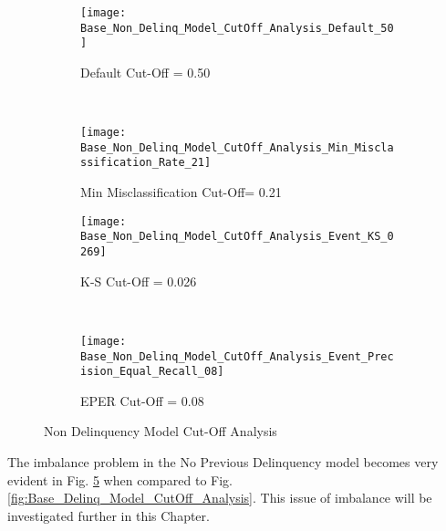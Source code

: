 \begin{figure}[H]
	\centering
	\begin{subfigure}[b]{ 0.45\textwidth}
		\captionsetup{font=scriptsize}
		\texttt{[image: Base\_Non\_Delinq\_Model\_CutOff\_Analysis\_Default\_50]}\caption{Default Cut-Off = 0.50}\label{fig:Base_Non_Delinq_Model_CutOff_Analysis_Default_50}
	\end{subfigure}  ~\quad
	\begin{subfigure}[b]{0.45\textwidth}
		\captionsetup{font=scriptsize}
		\texttt{[image: Base\_Non\_Delinq\_Model\_CutOff\_Analysis\_Min\_Misclassification\_Rate\_21]}
		\caption{Min Misclassification Cut-Off= 0.21}\label{fig:Base_Non_Delinq_Model_CutOff_Analysis_Min_Misclassification_Rate_17}
	\end{subfigure} 
	\medskip \newline
	\begin{subfigure}[b]{0.45\textwidth}
		\captionsetup{font=scriptsize}
		\texttt{[image: Base\_Non\_Delinq\_Model\_CutOff\_Analysis\_Event\_KS\_0269]}
		\caption{K-S Cut-Off = 0.026}\label{fig:Base_Non_Delinq_Model_CutOff_Analysis_Event_KS_026}
	\end{subfigure} ~\quad
	\begin{subfigure}[b]{0.45\textwidth}
		\captionsetup{font=scriptsize}
		\texttt{[image: Base\_Non\_Delinq\_Model\_CutOff\_Analysis\_Event\_Precision\_Equal\_Recall\_08]}
		\caption{EPER Cut-Off = 0.08}\label{fig:Base_Non_Delinq_Model_CutOff_Analysis_Event_Precision_Equal_Recall_09}
	\end{subfigure}
	\caption{Non Delinquency Model Cut-Off Analysis}
	\label{fig:NonDelinquencyModelCutOffAnalysis}
\end{figure}

The imbalance problem in the No Previous Delinquency model becomes very evident in Fig.  \ref{fig:NonDelinquencyModelCutOffAnalysis} when compared to Fig. \ref{fig:Base_Delinq_Model_CutOff_Analysis}. This issue of imbalance will be investigated further in this Chapter.

